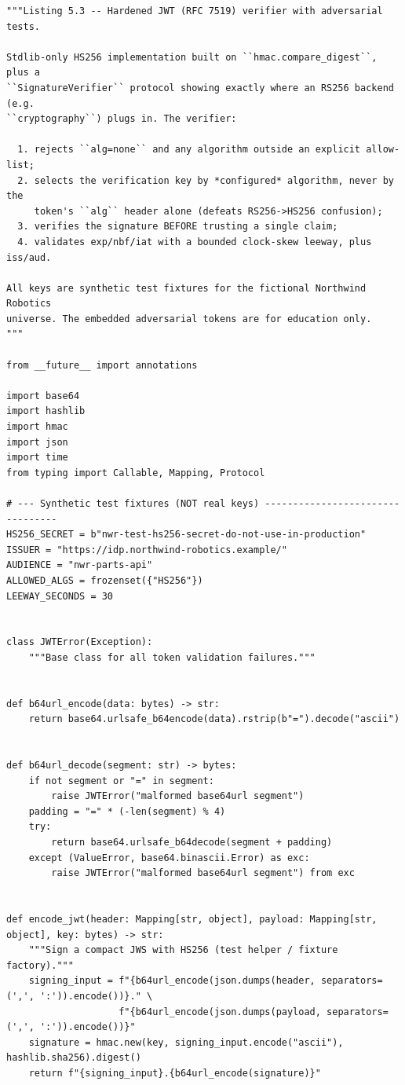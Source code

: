 \begin{verbatim}
"""Listing 5.3 -- Hardened JWT (RFC 7519) verifier with adversarial tests.

Stdlib-only HS256 implementation built on ``hmac.compare_digest``, plus a
``SignatureVerifier`` protocol showing exactly where an RS256 backend (e.g.
``cryptography``) plugs in. The verifier:

  1. rejects ``alg=none`` and any algorithm outside an explicit allow-list;
  2. selects the verification key by *configured* algorithm, never by the
     token's ``alg`` header alone (defeats RS256->HS256 confusion);
  3. verifies the signature BEFORE trusting a single claim;
  4. validates exp/nbf/iat with a bounded clock-skew leeway, plus iss/aud.

All keys are synthetic test fixtures for the fictional Northwind Robotics
universe. The embedded adversarial tokens are for education only.
"""

from __future__ import annotations

import base64
import hashlib
import hmac
import json
import time
from typing import Callable, Mapping, Protocol

# --- Synthetic test fixtures (NOT real keys) ---------------------------------
HS256_SECRET = b"nwr-test-hs256-secret-do-not-use-in-production"
ISSUER = "https://idp.northwind-robotics.example/"
AUDIENCE = "nwr-parts-api"
ALLOWED_ALGS = frozenset({"HS256"})
LEEWAY_SECONDS = 30


class JWTError(Exception):
    """Base class for all token validation failures."""


def b64url_encode(data: bytes) -> str:
    return base64.urlsafe_b64encode(data).rstrip(b"=").decode("ascii")


def b64url_decode(segment: str) -> bytes:
    if not segment or "=" in segment:
        raise JWTError("malformed base64url segment")
    padding = "=" * (-len(segment) % 4)
    try:
        return base64.urlsafe_b64decode(segment + padding)
    except (ValueError, base64.binascii.Error) as exc:
        raise JWTError("malformed base64url segment") from exc


def encode_jwt(header: Mapping[str, object], payload: Mapping[str, object], key: bytes) -> str:
    """Sign a compact JWS with HS256 (test helper / fixture factory)."""
    signing_input = f"{b64url_encode(json.dumps(header, separators=(',', ':')).encode())}." \
                    f"{b64url_encode(json.dumps(payload, separators=(',', ':')).encode())}"
    signature = hmac.new(key, signing_input.encode("ascii"), hashlib.sha256).digest()
    return f"{signing_input}.{b64url_encode(signature)}"



\end{verbatim}

